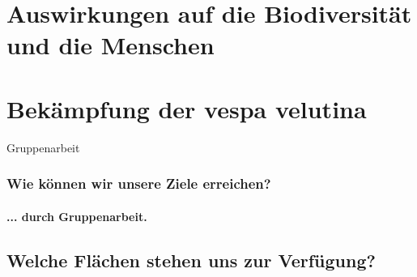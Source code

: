 \documentclass[aspectratio=169]{beamer}
\begin{document}
\section{Auswirkungen auf die Biodiversität und die Menschen}
\section{Bekämpfung der vespa velutina}





\begin{frame}{Gruppenarbeit}
	\frametitle{Wie können wir unsere Ziele erreichen?} 
	\framesubtitle{... durch Gruppenarbeit.}
\end{frame}
\subsection[Flächen]{Welche Flächen stehen uns zur Verfügung?}
\end{document}
